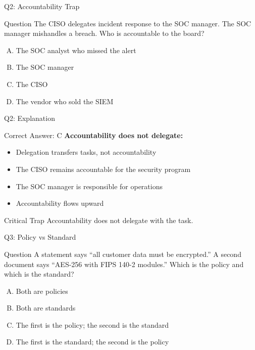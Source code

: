 \documentclass{beamer}
\begin{document}
	\begin{frame}{Q2: Accountability Trap}
		\begin{block}{Question}
			The CISO delegates incident response to the SOC manager. The SOC manager mishandles a breach. Who is accountable to the board?
		\end{block}
		\begin{enumerate}[(A)]
			\item The SOC analyst who missed the alert
			\item The SOC manager
			\item The CISO
			\item The vendor who sold the SIEM
		\end{enumerate}
	\end{frame}
	
	\begin{frame}{Q2: Explanation}
		\begin{block}{Correct Answer: C}
			\textbf{Accountability does not delegate:}
			\begin{itemize}
				\item Delegation transfers tasks, not accountability
				\item The CISO remains accountable for the security program
				\item The SOC manager is responsible for operations
				\item Accountability flows upward
			\end{itemize}
		\end{block}
		\begin{alertblock}{Critical Trap}
			Accountability does not delegate with the task.
		\end{alertblock}
	\end{frame}
	
	\begin{frame}{Q3: Policy vs Standard}
		\begin{block}{Question}
			A statement says ``all customer data must be encrypted.'' A second document says ``AES-256 with FIPS 140-2 modules.'' Which is the policy and which is the standard?
		\end{block}
		\begin{enumerate}[(A)]
			\item Both are policies
			\item Both are standards
			\item The first is the policy; the second is the standard
			\item The first is the standard; the second is the policy
		\end{enumerate}
	\end{frame}
	
\end{document}
